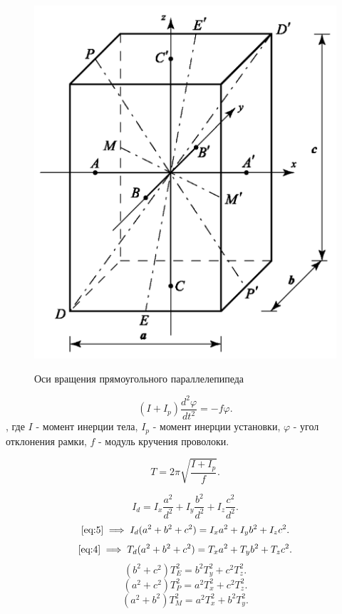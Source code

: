 \documentclass[a4paper,12pt]{article} %
\begin{document}
\begin{figure} [h]
	\includegraphics[scale = 0.3]{124/рис. 3.png}
	\label{pic:3} \caption[Рис. 3]{Оси вращения прямоугольного параллелепипеда}
\end{figure}

\begin{equation} (I + I_p) \frac{d^2\varphi}{dt^2} = -f\varphi. \label{eq:3} \end{equation}, где 
$I$ - момент инерции тела, 
$I_p$ - момент инерции установки, 
$\varphi$ - угол отклонения рамки, 
$f$ - модуль кру­чения проволоки.

\begin{equation} T = 2\pi \sqrt{\frac{I+I_p}{f}}. \label{eq:4} \end{equation}


\begin{equation} I_d = I_x \frac{a^2}{d^2} + I_y \frac{b^2}{d^2} + I_z \frac{c^2}{d^2}. \label{eq:5} \end{equation}
\begin{equation} \eqref{eq:5} \implies I_d (a^2 + b^2 + c^2) = I_x a^2 + I_y b^2 + I_z c^2. \label{eq:6} \end{equation}
\begin{equation} \eqref{eq:4} \implies T_d (a^2 + b^2 + c^2) = T_x a^2 + T_y b^2 + T_z c^2. \label{eq:7} \end{equation}
\begin{equation} (b^2 + c^2)T_E^2 = b^2 T_y^2 + c^2 T_z^2. \label{eq:8} \end{equation}
\begin{equation} (a^2 + c^2)T_P^2 = a^2 T_x^2 + c^2 T_z^2. \label{eq:9} \end{equation}
\begin{equation} (a^2 + b^2)T_M^2 = a^2 T_x^2 + b^2 T_y^2. \label{eq:10} \end{equation}
\end{document}
